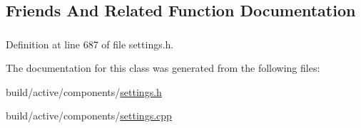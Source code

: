 \subsection{Friends And Related Function Documentation}
\hypertarget{classOkular_1_1Settings_a93d9787ea4f79cf73af4c94f3d279dc2}{
\subsubsection[{Settings\+Helper}]{\hspace{0.3cm}{\ttfamily [friend]}}}\label{classOkular_1_1Settings_a93d9787ea4f79cf73af4c94f3d279dc2}


Definition at line 687 of file settings.\+h.



The documentation for this class was generated from the following files\+:\begin{DoxyCompactItemize}
\item 
build/active/components/\hyperlink{active_2components_2settings_8h}{settings.\+h}\item 
build/active/components/\hyperlink{active_2components_2settings_8cpp}{settings.\+cpp}\end{DoxyCompactItemize}
